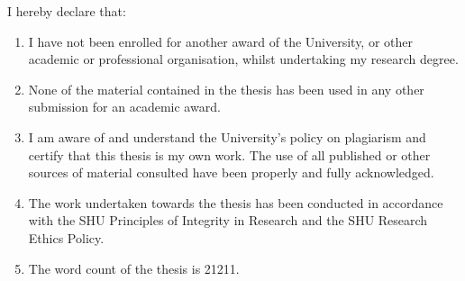 

I hereby declare that:
\begin{enumerate}
    \item I have not been enrolled for another award of the University, or other
academic or professional organisation, whilst undertaking my research
degree.
    \item None of the material contained in the thesis has been used in any other
submission for an academic award.
    \item I am aware of and understand the University's policy on plagiarism and
certify that this thesis is my own work. The use of all published or other
sources of material consulted have been properly and fully
acknowledged.
    \item The work undertaken towards the thesis has been conducted in
accordance with the SHU Principles of Integrity in Research and the
SHU Research Ethics Policy.
    \item The word count of the thesis is 21211.
\end{enumerate}

\vspace{5cm}

